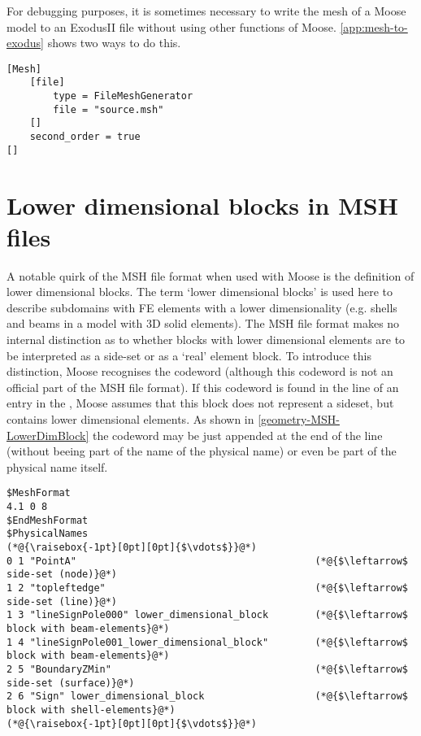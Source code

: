 For debugging purposes, it is sometimes necessary to write the mesh of a Moose
model to an ExodusII file without using other functions of Moose.
\autoref{app:mesh-to-exodus} shows two ways to do this.

\begin{lstlisting}[language=Moose, float, caption={Read mesh from a file},label={geometry-FileMeshGenerator}]
[Mesh]
    [file]
        type = FileMeshGenerator
        file = "source.msh"
    []
    second_order = true
[]
\end{lstlisting}

\section{Lower dimensional blocks in MSH files}
\label{geometry-MSH}

A notable quirk of the MSH file format when used with Moose is the definition
of lower dimensional blocks. The term ‘lower dimensional blocks’ is used here
to describe subdomains with FE elements with a lower dimensionality (e.g.
shells and beams in a model with 3D solid elements). The MSH file format makes
no internal distinction as to whether blocks with lower dimensional elements
are to be interpreted as a side-set or as a ‘real’ element block. To introduce
this distinction, Moose recognises the codeword
 (although this codeword is not an official
part of the MSH file format). If this codeword is found in the line of an entry
in the , Moose assumes that this block does not
represent a sideset, but contains lower dimensional elements. As shown in
\autoref{geometry-MSH-LowerDimBlock} the codeword may be just appended at the
end of the line (without beeing part of the name of the physical name) or even
be part of the physical name itself.

\begin{lstlisting}[float, caption={Fragment of an MSH file containing ‘lower dimensional blocks’},label={geometry-MSH-LowerDimBlock}]
$MeshFormat
4.1 0 8
$EndMeshFormat
$PhysicalNames
(*@{\raisebox{-1pt}[0pt][0pt]{$\vdots$}}@*)
0 1 "PointA"                                         (*@{$\leftarrow$ side-set (node)}@*)
1 2 "topleftedge"                                    (*@{$\leftarrow$ side-set (line)}@*)
1 3 "lineSignPole000" lower_dimensional_block        (*@{$\leftarrow$ block with beam-elements}@*)
1 4 "lineSignPole001_lower_dimensional_block"        (*@{$\leftarrow$ block with beam-elements}@*)
2 5 "BoundaryZMin"                                   (*@{$\leftarrow$ side-set (surface)}@*)
2 6 "Sign" lower_dimensional_block                   (*@{$\leftarrow$ block with shell-elements}@*)
(*@{\raisebox{-1pt}[0pt][0pt]{$\vdots$}}@*)
\end{lstlisting}

